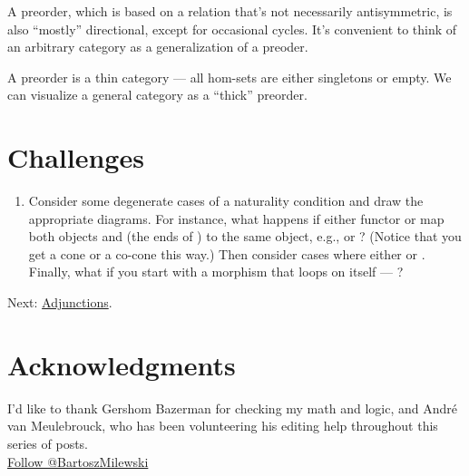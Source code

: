 A preorder, which is based on a relation that's not necessarily
antisymmetric, is also ``mostly'' directional, except for occasional
cycles. It's convenient to think of an arbitrary category as a
generalization of a preoder.

A preorder is a thin category --- all hom-sets are either singletons or
empty. We can visualize a general category as a ``thick'' preorder.

\section{Challenges}\label{challenges}

\begin{enumerate}
\tightlist
\item
  Consider some degenerate cases of a naturality condition and draw the
  appropriate diagrams. For instance, what happens if either functor
   or  map both objects  and 
  (the ends of ) to the same
  object, e.g.,  or ?
  (Notice that you get a cone or a co-cone this way.) Then consider
  cases where either  or .
  Finally, what if you start with a morphism that loops on itself ---
  ?
\end{enumerate}

Next:
\href{https://bartoszmilewski.com/2016/04/18/adjunctions/}{Adjunctions}.

\section{Acknowledgments}\label{acknowledgments}

I'd like to thank Gershom Bazerman for checking my math and logic, and
André van Meulebrouck, who has been volunteering his editing help
throughout this series of posts.\\
\href{https://twitter.com/BartoszMilewski}{Follow @BartoszMilewski}
